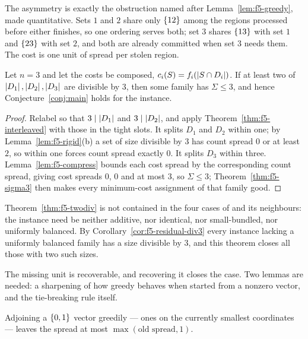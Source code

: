 The asymmetry is exactly the obstruction named after
Lemma~\ref{lem:f5-greedy}, made quantitative. Sets $1$ and $2$ share only
$\left\{12\right\}$ among the regions processed before either finishes, so one ordering
serves both; set $3$ shares $\left\{13\right\}$ with set $1$ and $\left\{23\right\}$ with set $2$,
and both are already committed when set $3$ needs them. The cost is one unit of
spread per stolen region.

\begin{theorem}
\label{thm:f5-twodiv}
Let $n = 3$ and let the costs be composed, $c_i(S) = f_i(\left\lvert S \cap D_i\right\rvert)$.
If at least two of $\left\lvert D_1\right\rvert,\left\lvert D_2\right\rvert,\left\lvert D_3\right\rvert$ are divisible by $3$, then
some family has $\Sigma \le 3$, and hence Conjecture~\ref{conj:main} holds for
the instance.
\end{theorem}

\begin{proof}
Relabel so that $3 \mid \left\lvert D_1\right\rvert$ and $3 \mid \left\lvert D_2\right\rvert$, and apply
Theorem~\ref{thm:f5-interleaved} with those in the tight slots. It splits $D_1$
and $D_2$ within one; by Lemma~\ref{lem:f5-rigid}(b) a set of size divisible by
$3$ has count spread $0$ or at least $2$, so within one forces count spread
exactly $0$. It splits $D_3$ within three. Lemma~\ref{lem:f5-compress} bounds
each cost spread by the corresponding count spread, giving cost spreads $0$, $0$
and at most $3$, so $\Sigma \le 3$; Theorem~\ref{thm:f5-sigma3} then makes every
minimum-cost assignment of that family good.
\end{proof}

Theorem~\ref{thm:f5-twodiv} is not contained in the four cases of
 and its neighbours: the instance need be neither
additive, nor identical, nor small-bundled, nor uniformly balanced. By
Corollary~\ref{cor:f5-residual-div3} every instance lacking a uniformly balanced
family has a size divisible by $3$, and this theorem closes all those with two
such sizes.

The missing unit is recoverable, and recovering it closes the case. Two lemmas
are needed: a sharpening of how greedy behaves when started from a nonzero
vector, and the tie-breaking rule itself.

\begin{lemma}
\label{lem:f5-greedy2}
Adjoining a $\left\{0,1\right\}$ vector greedily --- ones on the currently smallest
coordinates --- leaves the spread at most $\max(\text{old spread}, 1)$.
\end{lemma}

